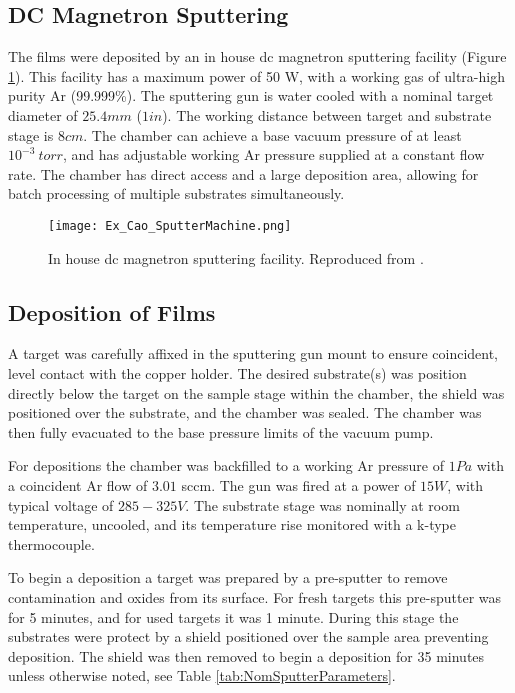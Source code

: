 \documentclass[a4paper,12pt,oneside]{report}%
\begin{document}
\subsection{DC Magnetron Sputtering}
The films were deposited by an in house \acrshort{dc} magnetron sputtering facility (Figure \ref{fig:CaoSputtering}). This facility has a maximum power of 50 W, with a working gas of ultra-high purity Ar (99.999\%). The sputtering gun is water cooled with a nominal target diameter of $25.4 mm$ ($1 in$). The working distance between target and substrate stage is $8 cm$. The chamber can achieve a base vacuum pressure of at least $10^{-3}~ torr$, and has adjustable working Ar pressure supplied at a constant flow rate. The chamber has direct access and a large deposition area, allowing for batch processing of multiple substrates simultaneously.

\begin{figure}[htbp]
	\centering
	\texttt{[image: Ex\_Cao\_SputterMachine.png]}
	\caption[In house \acrshort{dc} magnetron sputtering facility.]{In house \acrshort{dc} magnetron sputtering facility. Reproduced from \cite{Cao2013}.}
	\label{fig:CaoSputtering}
\end{figure}

\subsection{Deposition of Films} \label{sec:DepositionOfFilms}
A target was carefully affixed in the sputtering gun mount to ensure coincident, level contact with the copper holder. The desired substrate(s) was position directly below the target on the sample stage within the chamber, the shield was positioned over the substrate, and the chamber was sealed. The chamber was then fully evacuated to the base pressure limits of the vacuum pump. 

For depositions the chamber was backfilled to a working Ar pressure of $1Pa$ with a coincident Ar flow of $3.01$ \acrshort{sccm}. The gun was fired at a power of $15W$, with typical voltage of $285-325V$. The substrate stage was nominally at room temperature, uncooled, and its temperature rise monitored with a k-type thermocouple. 

To begin a deposition a target was prepared by a pre-sputter to remove contamination and oxides from its surface. For fresh targets this pre-sputter was for 5 minutes, and for used targets it was 1 minute. During this stage the substrates were protect by a shield positioned over the sample area preventing deposition. The shield was then removed to begin a deposition for 35 minutes unless otherwise noted, see Table \ref{tab:NomSputterParameters}. 
\end{document}
